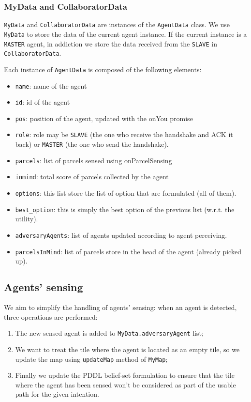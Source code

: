 \documentclass[10pt]{article}
\begin{document}
\subsubsection{MyData and CollaboratorData}

\texttt{MyData} and \texttt{CollaboratorData} are instances of the \texttt{AgentData} class. We use \texttt{MyData} to store the data of the current agent instance. If the current instance is a \texttt{MASTER} agent, in addiction we store the data received from the \texttt{SLAVE} in \texttt{CollaboratorData}.

Each instance of \texttt{AgentData} is composed of the following elements:

\begin{itemize}
    \item \texttt{name}: name of the agent
    \item \texttt{id}: id of the agent
    \item \texttt{pos}: position of the agent, updated with the onYou promise
    \item \texttt{role}: role may be \texttt{SLAVE} (the one who receive the handshake and ACK it back) or \texttt{MASTER} (the one who send the handshake). 
    \item \texttt{parcels}: list of parcels sensed using onParcelSensing
    \item \texttt{inmind}: total score of parcels collected by the agent
    \item \texttt{options}: this list store the list of option that are formulated (all of them).
    \item \texttt{best\_option}: this is simply the best option of the previous list (w.r.t. the utility).
    \item \texttt{adversaryAgents}: list of agents updated according to agent perceiving. 
    \item \texttt{parcelsInMind}: list of parcels store in the head of the agent (already picked up).
\end{itemize}

\subsection{Agents' sensing}
\label{agents}
We aim to simplify the handling of agents' sensing: when an agent is detected, three operations are performed:

\begin{enumerate}
    \item The new sensed agent is added to \texttt{MyData.adversaryAgent} list;
    \item We want to treat the tile where the agent is located as an empty tile, so we update the map using \texttt{updateMap} method of \texttt{MyMap};
    \item Finally we update the PDDL belief-set formulation to ensure that the tile where the agent has been sensed won't be considered as part of the usable path for the given intention.
\end{enumerate}
\end{document}
